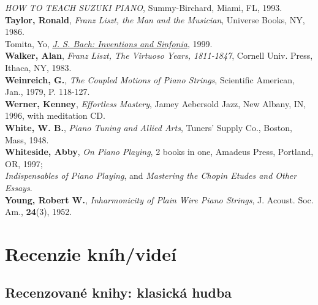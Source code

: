 \textit{HOW TO TEACH SUZUKI PIANO}, Summy-Birchard, Miami, FL, 1993.\\
\textbf{Taylor, Ronald}, \textit{Franz Liszt, the Man and the Musician}, Universe Books, NY, 1986.\\
Tomita, Yo, \href{http://www.music.qub.ac.uk/ tomita/essay/inventions.html}{\textit{J. S. Bach: Inventions and Sinfonia}}, 1999.\\
\textbf{Walker, Alan}, \textit{Franz Liszt, The Virtuoso Years, 1811-1847}, Cornell Univ. Press, Ithaca, NY, 1983.\\
\textbf{Weinreich, G.}, \textit{The Coupled Motions of Piano Strings}, Scientific American, Jan., 1979, P. 118-127.\\
\textbf{Werner, Kenney}, \textit{Effortless Mastery}, Jamey Aebersold Jazz, New Albany, IN, 1996, with meditation CD.\\
\textbf{White, W. B.}, \textit{Piano Tuning and Allied Arts}, Tuners' Supply Co., Boston, Mass, 1948.\\
\textbf{Whiteside, Abby}, \textit{On Piano Playing}, 2 books in one, Amadeus Press, Portland, OR, 1997;\\
\textit{Indispensables of Piano Playing}, and \textit{Mastering the Chopin Etudes and Other Essays}.\\
\textbf{Young, Robert W.}, \textit{Inharmonicity of Plain Wire Piano Strings}, J. Acoust. Soc. Am., \textbf{24}(3), 1952.

\section*{Recenzie kníh/videí}

\subsection*{Recenzované knihy: klasická hudba}

